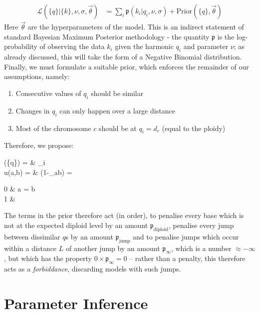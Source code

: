 \documentclass[fleqn,usenatbib]{acmart}
\begin{document}
{					\begin{align}
						\mathcal{L}(\{q\} | \{k\}, \nu,\sigma,\vec{\theta}) & = \sum_i \mathfrak{p}\left(k_i | q_i, \nu,\sigma \right) + \text{Prior}(\{q\},\vec{\theta}) \label{E:Score}
					\end{align}
					Here $\vec{\theta}$ are the hyperparameters of the model. This is an indirect statement of standard Bayesian Maximum Posterior methodology - the quantity $\mathfrak{p}$ is the log-probability of observing the data $k_i$ given the harmonic $q_i$ and parameter $\nu$; as already discussed, this will take the form of a Negative Binomial distribution. Finally, we must formulate a suitable prior, which enforces the remainder of our assumptions, namely:
					\begin{enumerate}
						\item Consecutive values of $q_i$ should be similar
						\item Changes in $q_i$ can only happen over a large distance
						\item Most of the chromosome $c$ should be at $q_i = d_c$ (equal to the ploidy)
					\end{enumerate}
					Therefore, we propose:
					\begin{spalign}
						(\{q\})   = & \sum_i \Bigg[  \mathfrak{p}_\text{ploidy} u(q_i,d_c)  + u(q_i,q_{i-1})\left( \mathfrak{p}_\text{jump} +  \mathfrak{p}_\infty \sum_{j = i-L}^{i-1} u(q_j,q_{i-1})  \right)\Bigg]
						\\
						u(a,b)  = & (1-\delta_{ab}) = \begin{cases}
							0 & {a = b}
							\\
							1 & 
						\end{cases}\label{E:Prior}
					\end{spalign}
					The terms in the prior therefore act (in order), to penalise every base which is not at the expected diploid level by an amount $\mathfrak{p}_\text{diploid}$, penalise every jump between dissimilar $q$s by an amount $\mathfrak{p}_\text{jump}$ and to penalise jumps which occur within a distance $L$ of another jump by an amount $\mathfrak{p}_\infty$, which is a number $\approx -\infty$, but which has the property $0 \times \mathfrak{p}_\infty = 0$ -- rather than a penalty, this therefore acts as a \textit{forbiddance}, discarding models with such jumps.

		\section{Parameter Inference}\label{A:Parameters}


}
\end{document}
